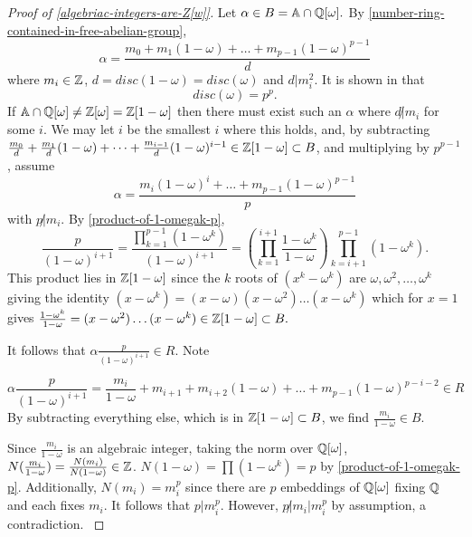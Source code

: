 \begin{proof}[Proof of \cref{algebriac-integers-are-Z[w]}]

Let $\alpha\in B=\mathbb{A}\cap\mathbb{Q}[\omega].$ By \cref{number-ring-contained-in-free-abelian-group}, 
$$\alpha=\frac{m_0+m_1(1-\omega)+\dots+m_{p-1}(1-\omega)^{p-1}}{d}$$ where $m_i\in \mathbb{Z}$, $d=disc(1-\omega)=disc(\omega)$ and $d|m_i^2$. It is shown in \cite{NumberFields} that $$disc(\omega)=p^p.$$ If $\mathbb{A}\cap\mathbb{Q}[\omega]\neq \mathbb{Z}[\omega]=\mathbb{Z}[1-\omega]$ then there must exist such an $\alpha$ where $d\not | m_i$ for some $i$. We may let $i$ be the smallest $i$ where this holds, and, by subtracting $\frac{m_0}{d}+\frac{m_1}{d}(1-\omega)+\dots+\frac{m_{i-1}}{d}(1-\omega)^{i-1}\in \mathbb{Z}[1-\omega]\subset B$, and multiplying by $p^{p-1}$, assume $$\alpha=\frac{m_i(1-\omega)^i+\dots+m_{p-1}(1-\omega)^{p-1}}{p}$$ with $p\not | m_i$. By \cref{product-of-1-omegak-p}, $$\frac{p}{(1-\omega)^{i+1}}=\frac{\prod_{k=1}^{p-1} (1-\omega^k)}{(1-\omega)^{i+1}}=(\prod_{k=1}^{i+1}\frac{1-\omega^k}{1-\omega})\prod_{k=i+1}^{p-1}(1-\omega^k).$$
This product lies in $\mathbb{Z}[1-\omega]$ since the $k$ roots of $(x^k-\omega^k)$ are $\omega,\omega^2,\dots,\omega^k$ giving the identity $(x-\omega^k)=(x-\omega)(x-\omega^2)\dots(x-\omega^k)$ which for $x=1$ gives $\frac{1-\omega^k}{1-\omega}=(x-\omega^2)\dots(x-\omega^k)\in \mathbb{Z}[1-\omega]\subset B.$

It follows that $\alpha \frac{p}{(1-\omega)^{i+1}}\in R.$ Note

$$\alpha \frac{p}{(1-\omega)^{i+1}}=\frac{m_i}{1-\omega}+m_{i+1}+m_{i+2}(1-\omega)+\dots+m_{p-1}(1-\omega)^{p-i-2}\in R$$
By subtracting everything else, which is in $\mathbb{Z}[1-\omega]\subset B$, we find $\frac{m_i}{1-\omega}\in B$.

Since $\frac{m_i}{1-\omega}$ is an algebraic integer, taking the norm over $\mathbb{Q}[\omega]$, $N(\frac{m_i}{1-\omega})=\frac{N(m_i)}{N(1-\omega)}\in \mathbb{Z}$. $N(1-\omega)=\prod(1-\omega^k)=p$ by \cref{product-of-1-omegak-p}. Additionally, $N(m_i)=m_i^p$ since there are $p$ embeddings of $\mathbb{Q}[\omega]$ fixing $\mathbb{Q}$ and each fixes $m_i$. It follows that $p|m_i^p$. However, $p\not | m_i | m_i^p$ by assumption, a contradiction. \cite{NumberFields}
\end{proof}


